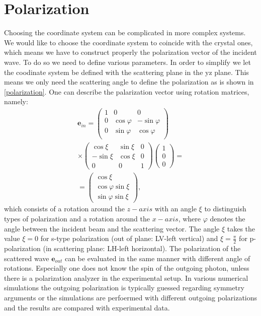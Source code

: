\documentclass[twocolumn,amsmath,superscriptaddress,amssymb]{revtex4-1}
\renewcommand{\thefigure}{Fig.\arabic{figure}}
\renewcommand{\theequation}{Eq.\arabic{equation}}
\let\vec\mathbf
\begin{document}
\section{Polarization}
\renewcommand{\thefigure}{Fig.A\arabic{figure}}
\renewcommand{\theequation}{Eq.A\arabic{equation}}

Choosing the coordinate system can be complicated in more complex systems. We would like to choose the coordinate system to coincide with the crystal ones, which means we have to construct properly the polarization vector of the incident wave. To do so we need to define various parameters. In order to simplify we let the coodinate system be defined with the scattering plane in the yz plane. This means we only need the scattering angle to define the polarization as is shown in \ref{polarization}. One can describe the palarization vector using rotation matrices, namely:
\begin{equation}
\begin{split}
\vec{e}_{in} = \left(
\begin{array}{ccc}
1&0&0\\
0&\cos\varphi&-\sin\varphi\\
0&\sin\varphi&\cos\varphi\\
\end{array}\right)\\
\times\left(
\begin{array}{ccc}
\cos\xi&\sin\xi&0\\
-\sin\xi&\cos\xi&0\\
0&0&1
\end{array}\right)\left(
\begin{array}{c}
1\\0\\0
\end{array}\right)=\\
=\left(
\begin{array}{c}
\cos\xi\\ \cos\varphi \sin\xi\\ \sin\varphi \sin\xi
\end{array}\right),
\end{split}
\end{equation}
\noindent which consists of a rotation around the $z-axis$ with an angle $\xi$ to distinguish types of polarization and a rotation around the $x-axis$, where $\varphi$ denotes the angle between the incident beam and the scattering vector. The angle $\xi$ takes the value $\xi=0$ for s-type polarization (out of plane: LV-left vertical) and $\xi=\frac{\pi}{2}$ for p-polarization (in scattering plane: LH-left horizontal). The polarization of the scattered wave $\vec{e}_{out}$ can be evaluated in the same manner with different angle of rotations. Especially one does not know the spin of the outgoing photon, unless there is a polarization analyzer in the experimental setup. In various numerical simulations \cite{Haverkort,} the outgoing polarization is typically guessed regarding symmetry arguments or the simulations are perfoermed with different outgoing polarizations \cite{Haverkort2,} and the results are compared with experimental data.
%
\end{document}
